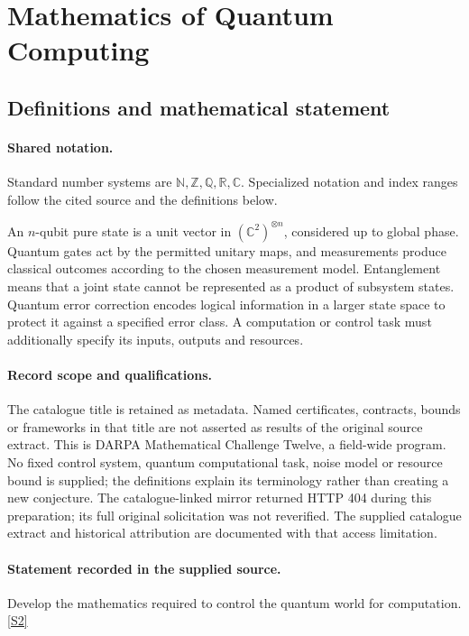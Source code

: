 \documentclass[11pt]{article}
\newcommand{\sref}[2]{\hyperlink{source:#1:#2}{[S#2]}}
\begin{document}
\section{Mathematics of Quantum Computing}\label{statement}

\subsection{Definitions and mathematical statement}

\paragraph{Shared notation.}Standard number systems are $\mathbb N,\mathbb Z,\mathbb Q,\mathbb R,\mathbb C$. Specialized notation and index ranges follow the cited source and the definitions below.


An $n$-qubit pure state is a unit vector in $(\mathbb C^2)^{\otimes n}$, considered up to global phase. Quantum gates act by the permitted unitary maps, and measurements produce classical outcomes according to the chosen measurement model. Entanglement means that a joint state cannot be represented as a product of subsystem states. Quantum error correction encodes logical information in a larger state space to protect it against a specified error class. A computation or control task must additionally specify its inputs, outputs and resources.
\paragraph{Record scope and qualifications.}
The catalogue title is retained as metadata. Named certificates, contracts, bounds or frameworks in that title are not asserted as results of the original source extract.
This is DARPA Mathematical Challenge Twelve, a field-wide program. No fixed control system, quantum computational task, noise model or resource bound is supplied; the definitions explain its terminology rather than creating a new conjecture. The catalogue-linked mirror returned HTTP 404 during this preparation; its full original solicitation was not reverified. The supplied catalogue extract and historical attribution are documented with that access limitation.
\paragraph{Statement recorded in the supplied source.}
Develop the mathematics required to control the quantum world for computation. \sref{statement}{2}
\end{document}
